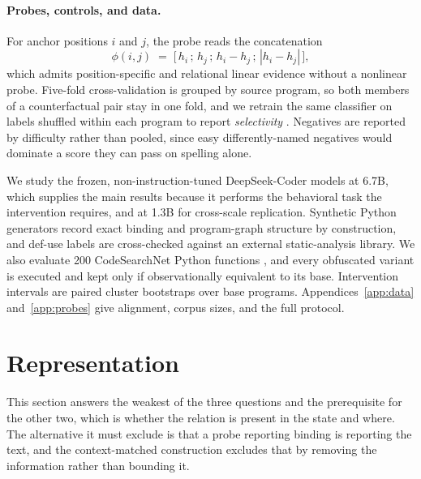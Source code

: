 \documentclass{article}
\begin{document}
\paragraph{Probes, controls, and data.}
For anchor positions $i$ and $j$, the probe reads the concatenation
%
\begin{equation}
  \phi(i,j) \;=\; \big[\,h_i \,;\, h_j \,;\, h_i - h_j \,;\, |h_i - h_j|\,\big],
  \label{eq:feature}
\end{equation}
%
which admits position-specific and relational linear evidence without a nonlinear probe. Five-fold cross-validation is grouped by source program, so both members of a counterfactual pair stay in one fold, and we retrain the same classifier on labels shuffled within each program to report \emph{selectivity} \citep{hewitt2019control}. Negatives are reported by difficulty rather than pooled, since easy differently-named negatives would dominate a score they can pass on spelling alone.

We study the frozen, non-instruction-tuned DeepSeek-Coder models at 6.7B, which supplies the main results because it performs the behavioral task the intervention requires, and at 1.3B for cross-scale replication. Synthetic Python generators record exact binding and program-graph structure by construction, and def-use labels are cross-checked against an external static-analysis library. We also evaluate 200 CodeSearchNet Python functions \citep{husain2019codesearchnet}, and every obfuscated variant is executed and kept only if observationally equivalent to its base. Intervention intervals are paired cluster bootstraps over base programs. Appendices~\ref{app:data} and~\ref{app:probes} give alignment, corpus sizes, and the full protocol.

\section{Representation}
\label{sec:representation}

This section answers the weakest of the three questions and the prerequisite for the other two, which is whether the relation is present in the state and where. The alternative it must exclude is that a probe reporting binding is reporting the text, and the context-matched construction excludes that by removing the information rather than bounding it.
\end{document}
